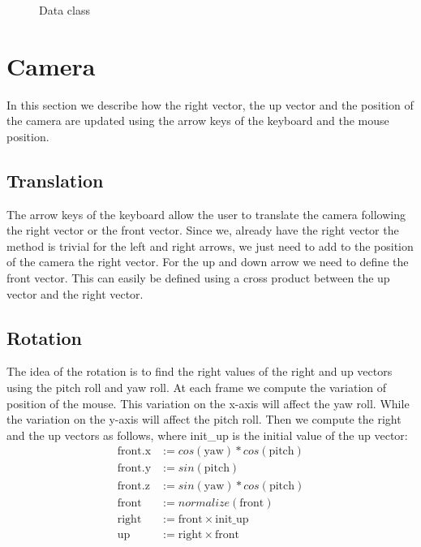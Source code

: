 \documentclass[a4paper,12pt,journal,twoside,compsoc]{PPIEEEtran}
\begin{document}
\begin{figure}
\centering
{}
\caption{Data class}
\label{Fig:umldata}
\end{figure}

\section{Camera}
\label{cam}
In this section we describe how the right vector, the up vector and the
position of the camera are updated using the arrow keys of the keyboard and the
mouse position.

\subsection{Translation}

The arrow keys of the keyboard allow the user to translate the camera following
the right vector or the front vector. Since we, already have the right vector
the method is trivial for the left and right arrows, we just need to add to the
position of the camera the right vector. For the up and down arrow we need to
define the front vector. This can easily be defined using a cross product between
the up vector and the right vector.

\subsection{Rotation}

The idea of the rotation is to find the right values of the right and up vectors
using the pitch roll and yaw roll. At each frame we compute the variation
of position of the mouse. This variation on the x-axis will affect the yaw
roll. While the variation on the y-axis will affect the pitch roll. Then
we compute the right and the up vectors as follows, where init\_up is the
initial value of the up vector:
\begin{align*}
  \text{front.x} &:= cos(\text{yaw}) * cos(\text{pitch}) \\
  \text{front.y} &:= sin(\text{pitch}) \\
  \text{front.z} &:= sin(\text{yaw}) * cos(\text{pitch}) \\
  \text{front} &:= normalize(\text{front}) \\
  \text{right} &:= \text{front} \times \text{init\_up} \\
  \text{up} &:= \text{right} \times \text{front} \\
\end{align*}
\end{document}
